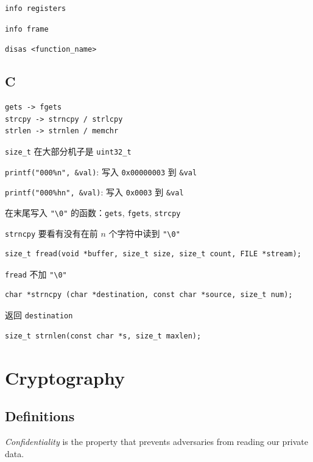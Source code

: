 \documentclass[9pt,landscape]{article}
\begin{document}
\begin{multicols}{2}
\texttt{info registers}

\texttt{info frame}

\texttt{disas <function\_name>}

\subsection{C}

\begin{lstlisting}
gets -> fgets
strcpy -> strncpy / strlcpy
strlen -> strnlen / memchr
\end{lstlisting}

\texttt{size\_t} 在大部分机子是 \texttt{uint32\_t}

\texttt{printf("000\%n", \&val)}: 写入 \texttt{0x00000003} 到 \texttt{\&val}

\texttt{printf("000\%hn", \&val)}: 写入 \texttt{0x0003} 到 \texttt{\&val}

在末尾写入 \texttt{"\textbackslash 0"} 的函数：\texttt{gets}, \texttt{fgets}, \texttt{strcpy}

\texttt{strncpy} 要看有没有在前 $n$ 个字符中读到 \texttt{"\textbackslash 0"}

\begin{lstlisting}
size_t fread(void *buffer, size_t size, size_t count, FILE *stream);
\end{lstlisting}

\texttt{fread} 不加 \texttt{"\textbackslash 0"}

\begin{lstlisting}
char *strncpy (char *destination, const char *source, size_t num);
\end{lstlisting}

返回 \texttt{destination}

\begin{lstlisting}
size_t strnlen(const char *s, size_t maxlen);
\end{lstlisting}

\section{Cryptography}

\subsection{Definitions}

\textit{Confidentiality} is the property that prevents adversaries from reading our private data.


\end{multicols}
\end{document}
